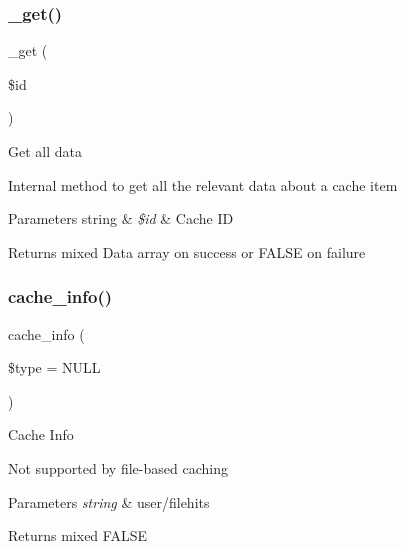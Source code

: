\subsubsection{\texorpdfstring{\+\_\+get()}{\_get()}}
{\footnotesize\ttfamily \+\_\+get (\begin{DoxyParamCaption}\item[{}]{\$id }\end{DoxyParamCaption})\hspace{0.3cm}{\ttfamily [protected]}}

Get all data

Internal method to get all the relevant data about a cache item


\begin{DoxyParams}[1]{Parameters}
string & {\em \$id} & Cache ID \\
\hline
\end{DoxyParams}
\begin{DoxyReturn}{Returns}
mixed Data array on success or F\+A\+L\+SE on failure 
\end{DoxyReturn}
\mbox{\label{class_c_i___cache__file_aa8b9c4d9f0387156736ccd8850f0727e}} 
\subsubsection{\texorpdfstring{cache\+\_\+info()}{cache\_info()}}
{\footnotesize\ttfamily cache\+\_\+info (\begin{DoxyParamCaption}\item[{}]{\$type = {\ttfamily NULL} }\end{DoxyParamCaption})}

Cache Info

Not supported by file-\/based caching


\begin{DoxyParams}{Parameters}
{\em string} & user/filehits \\
\hline
\end{DoxyParams}
\begin{DoxyReturn}{Returns}
mixed F\+A\+L\+SE 
\end{DoxyReturn}
\mbox{\label{class_c_i___cache__file_adb40b812890a8bc058bf6b7a0e1a54d9}} 
